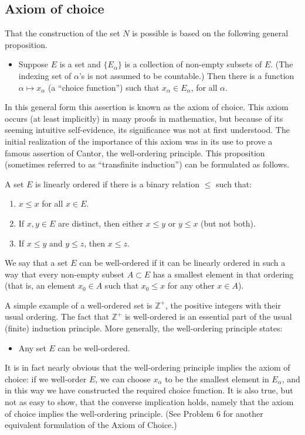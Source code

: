 \documentclass[11pt,openany]{book}
\begin{document}
\subsection*{Axiom of choice}

That the construction of the set $N$ is possible is based on the following general proposition.
\begin{itemize}
\item Suppose $E$ is a set and $\{E_\alpha\}$ is a collection of non-empty subsets of $E$. (The indexing set of $\alpha$'s is not assumed to be countable.) Then there is a function $\alpha\mapsto x_\alpha$ (a ``choice function'') such that $x_\alpha\in E_\alpha$, for all $\alpha$.
\end{itemize}
In this general form this assertion is known as the axiom of choice. This axiom occurs (at least implicitly) in many proofs in mathematics, but because of its seeming intuitive self-evidence, its significance was not at first understood. The initial realization of the importance of this axiom was in its use to prove a famous assertion of Cantor, the well-ordering principle. This proposition (sometimes referred to as ``transfinite induction'') can be formulated as follows.

A set $E$ is linearly ordered if there is a binary relation $\le$ such that:
\begin{enumerate}
\item[(a)] $x\le x$ for all $x\in E$.
\item[(b)] If $x,y\in E$ are distinct, then either $x\le y$ or $y\le x$ (but not both).
\item[(c)] If $x\le y$ and $y\le z$, then $x\le z$.
\end{enumerate}
We say that a set $E$ can be well-ordered if it can be linearly ordered in such a way that every non-empty subset $A\subset E$ has a smallest element in that ordering (that is, an element $x_0\in A$ such that $x_0\le x$ for any other $x\in A$).

A simple example of a well-ordered set is $\mathbb{Z}^+$, the positive integers with their usual ordering. The fact that $\mathbb{Z}^+$ is well-ordered is an essential part of the usual (finite) induction principle. More generally, the well-ordering principle states:
\begin{itemize}
\item Any set $E$ can be well-ordered.
\end{itemize}
It is in fact nearly obvious that the well-ordering principle implies the axiom of choice: if we well-order $E$, we can choose $x_\alpha$ to be the smallest element in $E_\alpha$, and in this way we have constructed the required choice function. It is also true, but not as easy to show, that the converse implication holds, namely that the axiom of choice implies the well-ordering principle. (See Problem 6 for another equivalent formulation of the Axiom of Choice.)
\end{document}
